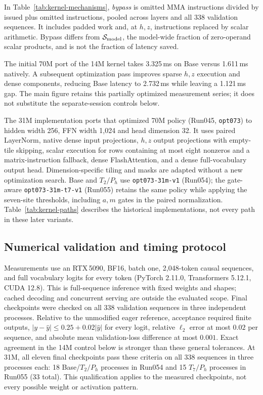 In Table~\ref{tab:kernel-mechanisms}, \emph{bypass} is omitted MMA instructions divided by issued plus omitted instructions, pooled across layers and all 338 validation sequences. It includes padded work and, at $h,z$, instructions replaced by scalar arithmetic. Bypass differs from $\mathcal{S}_{\mathrm{model}}$, the model-wide fraction of zero-operand scalar products, and is not the fraction of latency saved.

The initial 70M port of the 14M kernel takes 3.325\,ms on Base versus
1.611\,ms natively. A subsequent optimization pass improves sparse $h,z$
execution and dense components, reducing Base latency to 2.732\,ms while
leaving a 1.121\,ms gap. The main figure retains this partially optimized
measurement series; it does not substitute the separate-session controls below.

The 31M implementation ports that optimized 70M policy (Run045,
\texttt{opt073}) to hidden width 256, FFN width 1,024 and head dimension 32.
It uses paired LayerNorm, native dense input projections, $h,z$ output
projections with empty-tile skipping, scalar execution for rows containing at most eight nonzeros
and a matrix-instruction fallback, dense FlashAttention, and a dense
full-vocabulary output head. Dimension-specific tiling and masks are adapted
without a new optimization search. Base and $T_2/P_h$ use
\texttt{opt073-31m-v1} (Run054); the gate-aware
\texttt{opt073-31m-t7-v1} (Run055) retains the same policy while applying
the seven-site thresholds, including $a,m$ gates in the paired normalization.
Table~\ref{tab:kernel-paths} describes the historical implementations, not
every path in these later variants.

\subsection{Numerical validation and timing protocol}
\label{app:timing-protocol}
Measurements use an RTX\,5090, BF16, batch one, 2,048-token causal sequences,
and full vocabulary logits for every token (PyTorch 2.11.0, Transformers 5.12.1,
CUDA 12.8). This is full-sequence inference with fixed weights and shapes;
cached decoding and concurrent serving are outside the evaluated scope.
Final checkpoints were checked on all 338 validation sequences in three
independent processes. Relative to the unmodified eager reference, acceptance
required finite outputs, $|y-\hat y|\leq0.25+0.02|\hat y|$ for every logit,
relative $\ell_2$ error at most $0.02$ per sequence, and absolute mean
validation-loss difference at most $0.001$. Exact agreement in the 14M control
below is stronger than these general tolerances. At 31M, all eleven final checkpoints pass these criteria on all 338 sequences in three processes each: 18 Base/$T_2/P_h$ processes in Run054 and 15 $T_7/P_h$ processes in Run055 (33 total). This qualification applies to the measured checkpoints, not every possible weight or activation pattern.

